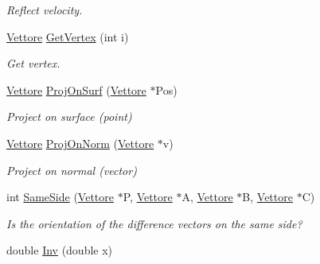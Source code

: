 \begin{DoxyCompactItemize}
\begin{DoxyCompactList}\small\item\em Reflect velocity. \end{DoxyCompactList}\item 
\hyperlink{classVettore}{Vettore} \hyperlink{classPiano_a1c0e56e45b12255147f5cbbc5a8e0b1f}{Get\+Vertex} (int i)\hypertarget{classPiano_a1c0e56e45b12255147f5cbbc5a8e0b1f}{}\label{classPiano_a1c0e56e45b12255147f5cbbc5a8e0b1f}

\begin{DoxyCompactList}\small\item\em Get vertex. \end{DoxyCompactList}\item 
\hyperlink{classVettore}{Vettore} \hyperlink{classPiano_a4aedb9029e37fb894e1e3a4514e4707d}{Proj\+On\+Surf} (\hyperlink{classVettore}{Vettore} $\ast$Pos)\hypertarget{classPiano_a4aedb9029e37fb894e1e3a4514e4707d}{}\label{classPiano_a4aedb9029e37fb894e1e3a4514e4707d}

\begin{DoxyCompactList}\small\item\em Project on surface (point) \end{DoxyCompactList}\item 
\hyperlink{classVettore}{Vettore} \hyperlink{classPiano_af86bbe20f8d523af9e2553f0039c088b}{Proj\+On\+Norm} (\hyperlink{classVettore}{Vettore} $\ast$v)\hypertarget{classPiano_af86bbe20f8d523af9e2553f0039c088b}{}\label{classPiano_af86bbe20f8d523af9e2553f0039c088b}

\begin{DoxyCompactList}\small\item\em Project on normal (vector) \end{DoxyCompactList}\item 
int \hyperlink{classPiano_a07236f42214a9066ed4c12a8b62ada12}{Same\+Side} (\hyperlink{classVettore}{Vettore} $\ast$P, \hyperlink{classVettore}{Vettore} $\ast$A, \hyperlink{classVettore}{Vettore} $\ast$B, \hyperlink{classVettore}{Vettore} $\ast$C)\hypertarget{classPiano_a07236f42214a9066ed4c12a8b62ada12}{}\label{classPiano_a07236f42214a9066ed4c12a8b62ada12}

\begin{DoxyCompactList}\small\item\em Is the orientation of the difference vectors on the same side? \end{DoxyCompactList}\item 
double \hyperlink{classPiano_a9341053ea31914d454cab1a86e2f8dd9}{Inv} (double x)\hypertarget{classPiano_a9341053ea31914d454cab1a86e2f8dd9}{}\label{classPiano_a9341053ea31914d454cab1a86e2f8dd9}


\end{DoxyCompactItemize}
